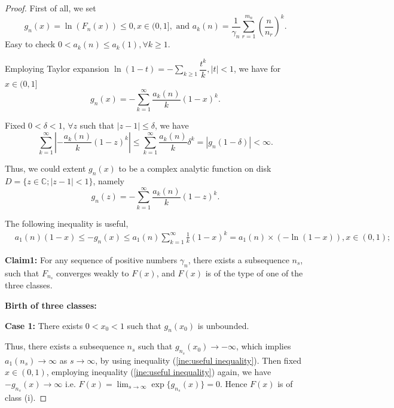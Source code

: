 \documentclass[12pt]{article}
\theoremstyle{plain}
\theoremstyle{definition}
\theoremstyle{remark}
\begin{document}
\begin{proof}
    First of all, we set $$g_n(x)=\ln(F_n(x))\leq 0,x\in(0,1], \text{ and }a_k{(n)}=\frac{1}{\gamma_{n}} \sum_{r=1}^{m_n} \left(\frac{n}{n_{r}}\right)^k.$$
    Easy to check $0<a_k{(n)}\leq a_k{(1)},\forall k\geq 1$.
    
    Employing Taylor expansion $\ln(1-t)=-\sum_{k\geq 1} \dfrac{t^k}{k},|t|<1$, we have for $x\in(0,1]$ 
    \begin{equation*}
    g_n(x)=-\sum_{k=1}^\infty \frac{a_k{(n)}}{k}(1-x)^k.
    \end{equation*}
    
    Fixed $ 0<\delta<1$, $\forall z$ such that $|z-1|\leq \delta$, we have
\begin{equation}\label{equ:uniformly bounded}
     \sum_{k=1}^\infty \left|-\frac{a_k{(n)}}{k}(1-z)^k\right|\leq \sum_{k=1}^\infty \frac{a_k{(n)}}{k}\delta^k=|g_n(1-\delta)|<\infty.
\end{equation}
    
    Thus, we could extent $g_n(x)$ to be a complex analytic function on disk $D=\{z\in\mathbb{C};|z-1|<1\}$, namely
    \begin{equation}\label{equ:taylor g_n(x)}
    g_n(z)=-\sum_{k=1}^\infty \frac{a_k{(n)}}{k}(1-z)^k.
    \end{equation}

    The following inequality is useful,
    \begin{align}    &a_1{(n)}(1-x)\leq-g_{n}(x)\leq a_1{(n)}\sum_{k=1}^\infty \frac{1}{k}(1-x)^k =a_1{(n)}\times (-\ln (1-x)),x\in(0,1);\label{ine:useful inequality}
    \end{align}


\textbf{Claim1: }For any sequence of positive numbers $\gamma_n$, there exists a subsequence $n_s$, such that $F_{n_s}$ converges weakly to $F(x)$, and $F(x)$ is of the type of one of the three classes.

\textbf{Birth of three classes:}

    \textbf{Case 1:} There exists $0<x_0<1$ such that $g_n(x_0)$ is unbounded.
    
    Thus, there exists a subsequence $n_s$ such that $g_{n_s}(x_0)\rightarrow -\infty$, which implies $a_1{(n_s)}\rightarrow \infty$ as $s\rightarrow \infty$, by using inequality (\ref{ine:useful inequality}). Then fixed $x\in(0,1)$, employing inequality (\ref{ine:useful inequality}) again, we have $-g_{n_s}(x)\rightarrow \infty$ i.e. $F(x)=\lim_{s\rightarrow\infty}\exp\{g_{n_s}(x)\}=0$. Hence $F(x)$ is of class (i).
    

\end{proof}
\end{document}
